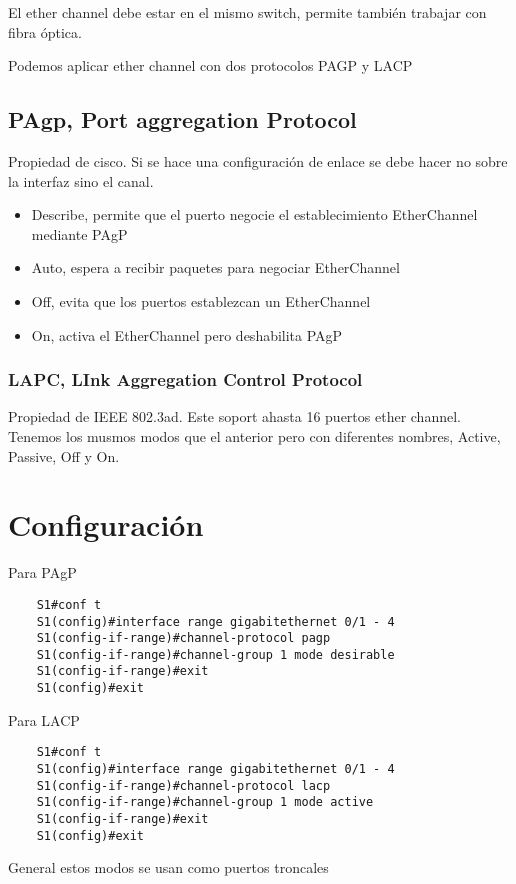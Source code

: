 El ether channel debe estar en el mismo switch, permite también trabajar con fibra óptica.

Podemos aplicar ether channel con dos protocolos PAGP y LACP

\subsection{PAgp, Port aggregation Protocol}
Propiedad de cisco.  Si se hace una configuración de enlace se debe hacer no sobre la interfaz sino el canal.

\begin{itemize}
    \item Describe, permite que el puerto negocie el establecimiento EtherChannel mediante PAgP 
    \item Auto, espera a recibir paquetes para negociar EtherChannel 
    \item Off, evita que los puertos establezcan un EtherChannel 
    \item On, activa el EtherChannel pero deshabilita PAgP
\end{itemize}

\subsubsection{LAPC, LInk Aggregation Control Protocol}
Propiedad de IEEE 802.3ad. Este soport ahasta 16 puertos ether channel. Tenemos los musmos modos que el anterior pero con diferentes nombres, Active, Passive, Off y On.

\section{Configuración}
Para PAgP
\begin{lstlisting}
    S1#conf t
    S1(config)#interface range gigabitethernet 0/1 - 4
    S1(config-if-range)#channel-protocol pagp 
    S1(config-if-range)#channel-group 1 mode desirable
    S1(config-if-range)#exit 
    S1(config)#exit 
\end{lstlisting}

Para LACP
\begin{lstlisting}
    S1#conf t
    S1(config)#interface range gigabitethernet 0/1 - 4
    S1(config-if-range)#channel-protocol lacp 
    S1(config-if-range)#channel-group 1 mode active
    S1(config-if-range)#exit 
    S1(config)#exit 
\end{lstlisting}

General estos modos se usan como puertos troncales 

